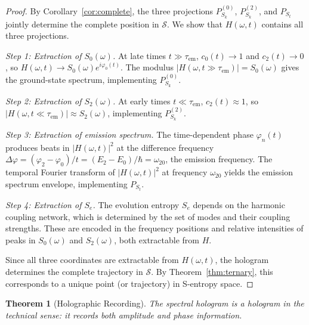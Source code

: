 \documentclass[11pt,a4paper]{article}
\newtheorem{theorem}{Theorem}[section]
\theoremstyle{definition}
\theoremstyle{remark}
\newcommand{\Sk}{S_k}
\newcommand{\St}{S_t}
\newcommand{\Se}{S_e}
\newcommand{\Sspace}{\mathcal{S}}
\begin{document}
\begin{proof}
By Corollary~\ref{cor:complete}, the three projections $P_{\Sk}^{(0)}$, $P_{\Sk}^{(2)}$, and $P_{\St}$ jointly determine the complete position in $\Sspace$. We show that $H(\omega, t)$ contains all three projections.

\emph{Step 1: Extraction of $S_0(\omega)$.} At late times $t \gg \tau_{\mathrm{em}}$, $c_0(t) \to 1$ and $c_2(t) \to 0$, so $H(\omega, t) \to S_0(\omega) e^{i\varphi_0(t)}$. The modulus $|H(\omega, t \gg \tau_{\mathrm{em}})| = S_0(\omega)$ gives the ground-state spectrum, implementing $P_{\Sk}^{(0)}$.

\emph{Step 2: Extraction of $S_2(\omega)$.} At early times $t \ll \tau_{\mathrm{em}}$, $c_2(t) \approx 1$, so $|H(\omega, t \ll \tau_{\mathrm{em}})| \approx S_2(\omega)$, implementing $P_{\Sk}^{(2)}$.

\emph{Step 3: Extraction of emission spectrum.} The time-dependent phase $\varphi_n(t)$ produces beats in $|H(\omega, t)|^2$ at the difference frequency $\Delta\varphi = (\varphi_2 - \varphi_0)/t = (E_2 - E_0)/\hbar = \omega_{20}$, the emission frequency. The temporal Fourier transform of $|H(\omega, t)|^2$ at frequency $\omega_{20}$ yields the emission spectrum envelope, implementing $P_{\St}$.

\emph{Step 4: Extraction of $\Se$.} The evolution entropy $\Se$ depends on the harmonic coupling network, which is determined by the set of modes and their coupling strengths. These are encoded in the frequency positions and relative intensities of peaks in $S_0(\omega)$ and $S_2(\omega)$, both extractable from $H$.

Since all three coordinates are extractable from $H(\omega, t)$, the hologram determines the complete trajectory in $\Sspace$. By Theorem~\ref{thm:ternary}, this corresponds to a unique point (or trajectory) in S-entropy space.
\end{proof}

\begin{theorem}[Holographic Recording]
\label{thm:holographic}
The spectral hologram is a hologram in the technical sense: it records both amplitude and phase information.
\end{theorem}
\end{document}
